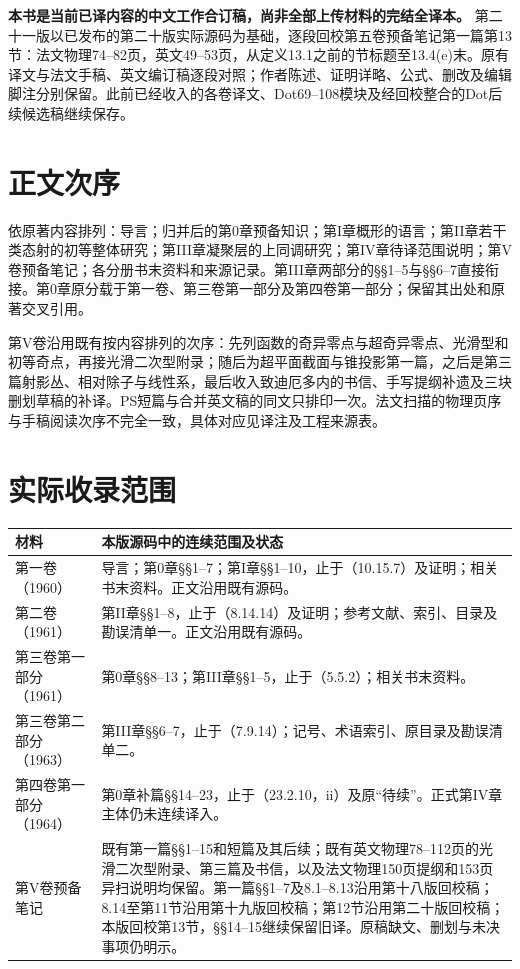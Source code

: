 \maketitle
{}
\noindent\textbf{本书是当前已译内容的中文工作合订稿，尚非全部上传材料的完结全译本。}
第二十一版以已发布的第二十版实际源码为基础，逐段回校第五卷预备笔记第一篇第13节：法文物理74--82页，英文49--53页，从定义13.1之前的节标题至13.4(e)末。原有译文与法文手稿、英文编订稿逐段对照；作者陈述、证明详略、公式、删改及编辑脚注分别保留。此前已经收入的各卷译文、Dot69--108模块及经回校整合的Dot后续候选稿继续保存。

\section*{正文次序}
依原著内容排列：导言；归并后的第0章预备知识；第I章概形的语言；第II章若干类态射的初等整体研究；第III章凝聚层的上同调研究；第IV章待译范围说明；第V卷预备笔记；各分册书末资料和来源记录。第III章两部分的§§1--5与§§6--7直接衔接。第0章原分载于第一卷、第三卷第一部分及第四卷第一部分；保留其出处和原著交叉引用。

第V卷沿用既有按内容排列的次序：先列函数的奇异零点与超奇异零点、光滑型和初等奇点，再接光滑二次型附录；随后为超平面截面与锥投影第一篇，之后是第三篇射影丛、相对除子与线性系，最后收入致迪厄多内的书信、手写提纲补遗及三块删划草稿的补译。PS短篇与合并英文稿的同文只排印一次。法文扫描的物理页序与手稿阅读次序不完全一致，具体对应见译注及工程来源表。

\clearpage
\section*{实际收录范围}
\begin{longtable}{@{}p{.25\linewidth}p{.67\linewidth}@{}}
\toprule 材料&本版源码中的连续范围及状态\\\midrule\endhead
第一卷（1960）&导言；第0章§§1--7；第I章§§1--10，止于（10.15.7）及证明；相关书末资料。正文沿用既有源码。\\
第二卷（1961）&第II章§§1--8，止于（8.14.14）及证明；参考文献、索引、目录及勘误清单一。正文沿用既有源码。\\
第三卷第一部分（1961）&第0章§§8--13；第III章§§1--5，止于（5.5.2）；相关书末资料。\\
第三卷第二部分（1963）&第III章§§6--7，止于（7.9.14）；记号、术语索引、原目录及勘误清单二。\\
第四卷第一部分（1964）&第0章补篇§§14--23，止于（23.2.10，ii）及原“待续”。正式第IV章主体仍未连续译入。\\
第V卷预备笔记&既有第一篇§§1--15和短篇及其后续；既有英文物理78--112页的光滑二次型附录、第三篇及书信，以及法文物理150页提纲和153页异扫说明均保留。第一篇§§1--7及8.1--8.13沿用第十八版回校稿；8.14至第11节沿用第十九版回校稿；第12节沿用第二十版回校稿；本版回校第13节，§§14--15继续保留旧译。原稿缺文、删划与未决事项仍明示。\\
\bottomrule
\end{longtable}

